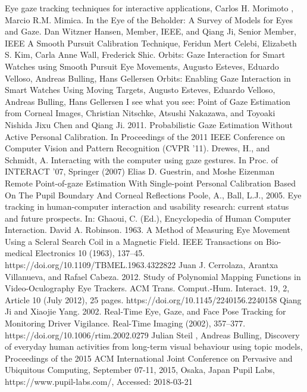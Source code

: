 \begin{thebibliography}{00}
   Eye gaze tracking techniques for interactive applications, Carlos H. Morimoto , Marcio R.M. Mimica.
   In the Eye of the Beholder: A Survey of Models for Eyes and Gaze. Dan Witzner Hansen, Member, IEEE, and Qiang Ji, Senior Member, IEEE
   A Smooth Pursuit Calibration Technique, Feridun  Mert  Celebi, Elizabeth S.  Kim, Carla  Anne  Wall, Frederick Shic.
   Orbits: Gaze Interaction for Smart Watches using Smooth Pursuit Eye Movements, Augusto Esteves, Eduardo Velloso, Andreas Bulling, Hans Gellersen
  Orbits: Enabling Gaze Interaction in Smart Watches Using Moving Targets, Augusto Esteves, Eduardo Velloso, Andreas Bulling, Hans Gellersen
  I see what you see: Point of Gaze Estimation from Corneal Images, Christian Nitschke, Atsushi Nakazawa, and Toyoaki Nishida
  Jixu Chen and Qiang Ji. 2011. Probabilistic Gaze Estimation Without Active Personal Calibration. In Proceedings of the 2011 IEEE Conference on Computer Vision and Pattern Recognition (CVPR '11).
  Drewes, H., and Schmidt, A. Interacting with the computer using gaze gestures. In Proc. of INTERACT '07, Springer (2007)
  Elias D. Guestrin, and Moshe Eizenman Remote Point-of-gaze Estimation With Single-point Personal Calibration Based On The Pupil Boundary And Corneal Reflections
  Poole, A., Ball, L.J., 2005. Eye tracking in human-computer interaction and usability research: current status and future prospects. In: Ghaoui, C. (Ed.), Encyclopedia of Human Computer Interaction.
  David A. Robinson. 1963. A Method of Measuring Eye Movement Using a Scleral Search Coil in a Magnetic Field. IEEE Transactions on Bio-medical Electronics 10 (1963), 137–45. https://doi.org/10.1109/TBMEL.1963.4322822
  Juan J. Cerrolaza, Arantxa Villanueva, and Rafael Cabeza. 2012. Study of Polynomial Mapping Functions in Video-Oculography Eye
Trackers. ACM Trans. Comput.-Hum. Interact. 19, 2, Article 10 (July 2012), 25 pages. https://doi.org/10.1145/2240156.2240158
  Qiang Ji and Xiaojie Yang. 2002. Real-Time Eye, Gaze, and Face Pose Tracking for Monitoring Driver Vigilance. Real-Time Imaging (2002), 357–377. https://doi.org/10.1006/rtim.2002.0279
  Julian Steil , Andreas Bulling, Discovery of everyday human activities from long-term visual behaviour using topic models, Proceedings of the 2015 ACM International Joint Conference on Pervasive and Ubiquitous Computing, September 07-11, 2015, Osaka, Japan 
  Pupil Labs, https://www.pupil-labs.com/, Accessed: 2018-03-21
  \end{thebibliography}


